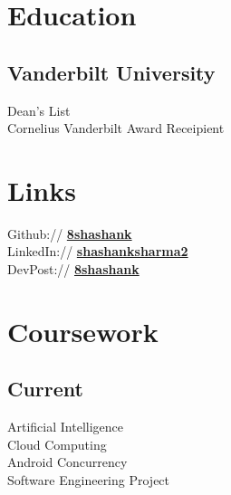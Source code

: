 \documentclass[letterpaper]{deedy-resume} %
\begin{document}
\begin{minipage}[t]{0.33\textwidth} %


\section{Education} 

\subsection{Vanderbilt University}

Dean's List \\
Cornelius Vanderbilt Award Receipient \\
\sectionspace %


\section{Links} 

Github:// \href{https://github.com/8shashank}{\bf 8shashank} \\
LinkedIn:// \href{https://www.linkedin.com/in/shashanksharma2}{\bf shashanksharma2} \\
DevPost:// \href{http://devpost.com/8shashank}{\bf 8shashank}

\sectionspace %


\section{Coursework}

\subsection{Current}

Artificial Intelligence \\
Cloud Computing \\
Android Concurrency \\
Software Engineering Project\\


\end{minipage}
\end{document}
